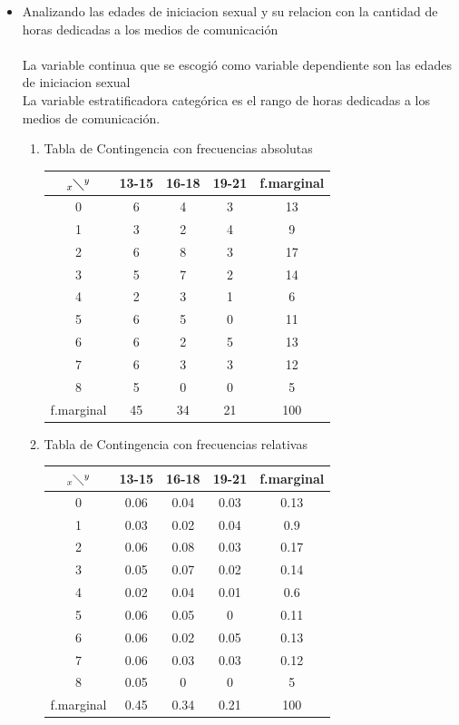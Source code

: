\documentclass[letterpaper,spanish,11pt]{article}
\begin{document}
\begin{itemize}
\begin{enumerate}
\end{enumerate}


\item Analizando las edades de iniciacion sexual y su relacion con la cantidad de horas dedicadas a los medios de comunicaci\'on\\\\
La variable continua que se escogi\'o como variable dependiente son las edades de iniciacion sexual\\
La variable estratificadora categ\'orica es el rango de horas dedicadas a los medios de comunicaci\'on.
\begin{enumerate}
\item Tabla de Contingencia con frecuencias absolutas\\

        \begin{tabular}[c]{|c|c c c|c|}
        \hline
        $_x\diagdown ^{y}$ & 13-15 & 16-18 & 19-21 & f.marginal \\
        \hline
        0 & 6 & 4 & 3 & 13 \\
        1 & 3 & 2 & 4 & 9 \\
        2 & 6 & 8 & 3 & 17 \\
        3 & 5 & 7 & 2 & 14 \\
        4 & 2 & 3 & 1 & 6 \\
        5 & 6 & 5 & 0 & 11 \\
        6 & 6 & 2 & 5 & 13\\
        7 & 6 & 3 & 3 & 12 \\
        8 & 5 & 0 & 0 & 5 \\
	\hline
        f.marginal & 45 & 34 & 21 & 100 \\
        \hline
        \end{tabular}


\item Tabla de Contingencia con frecuencias relativas

        \begin{tabular}[c]{|c|c c c|c|}
        \hline
        $_x\diagdown ^{y}$ & 13-15 & 16-18 & 19-21 & f.marginal \\
        \hline
        0 & 0.06 & 0.04 & 0.03 & 0.13 \\
        1 & 0.03 & 0.02 & 0.04 & 0.9 \\
        2 & 0.06 & 0.08 & 0.03 & 0.17 \\
        3 & 0.05 & 0.07 & 0.02 & 0.14 \\
        4 & 0.02 & 0.04 & 0.01 & 0.6 \\
        5 & 0.06 & 0.05 & 0 & 0.11 \\
        6 & 0.06 & 0.02 & 0.05 & 0.13\\
        7 & 0.06 & 0.03 & 0.03 & 0.12 \\
        8 & 0.05 & 0 & 0 & 5 \\
	\hline
        f.marginal & 0.45 & 0.34 & 0.21 & 100 \\
        \hline
        \end{tabular}



\end{enumerate}
\end{itemize}
\end{document}

